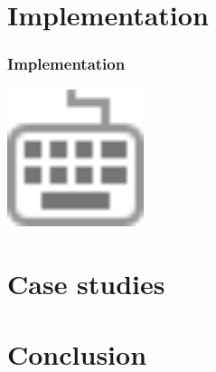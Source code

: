 \documentclass[hyperref={pdfpagelabels=false}]{beamer}
\begin{document}
  \section{Implementation}
  \begin{frame}
    \frametitle{Implementation}
    \begin{center}
      \includegraphics[width=4cm]{images/implementation}
    \end{center}
  \end{frame}

  \section{Case studies}

  \section{Conclusion}
\end{document}
